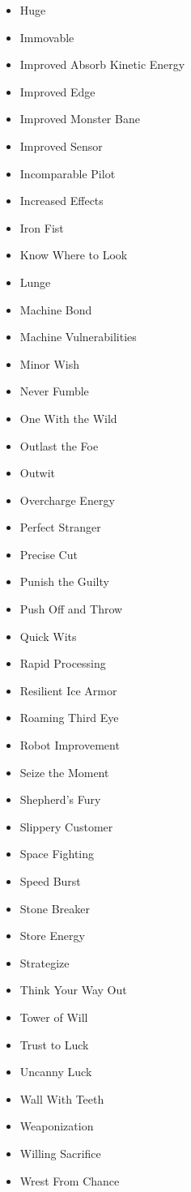 \begin{multicols}{2}
\begin{itemize}
\item Huge
\item Immovable
\item Improved Absorb Kinetic Energy
\item Improved Edge
\item Improved Monster Bane
\item Improved Sensor
\item Incomparable Pilot
\item Increased Effects
\item Iron Fist
\item Know Where to Look
\item Lunge
\item Machine Bond
\item Machine Vulnerabilities
\item Minor Wish
\item Never Fumble
\item One With the Wild
\item Outlast the Foe
\item Outwit
\item Overcharge Energy
\item Perfect Stranger
\item Precise Cut
\item Punish the Guilty
\item Push Off and Throw
\item Quick Wits
\item Rapid Processing
\item Resilient Ice Armor
\item Roaming Third Eye
\item Robot Improvement
\item Seize the Moment
\item Shepherd’s Fury
\item Slippery Customer
\item Space Fighting
\item Speed Burst
\item Stone Breaker
\item Store Energy
\item Strategize
\item Think Your Way Out
\item Tower of Will
\item Trust to Luck
\item Uncanny Luck
\item Wall With Teeth
\item Weaponization
\item Willing Sacrifice
\item Wrest From Chance
\end{itemize}


\end{multicols}
